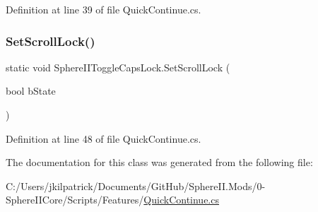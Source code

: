 Definition at line 39 of file Quick\+Continue.\+cs.

\mbox{\label{class_sphere_i_i_toggle_caps_lock_a9bcfc13eeb39d6b83d6d9215dccf620e}} 
\subsubsection{\texorpdfstring{SetScrollLock()}{SetScrollLock()}}
{\footnotesize\ttfamily static void Sphere\+I\+I\+Toggle\+Caps\+Lock.\+Set\+Scroll\+Lock (\begin{DoxyParamCaption}\item[{bool}]{b\+State }\end{DoxyParamCaption})\hspace{0.3cm}{\ttfamily [static]}}



Definition at line 48 of file Quick\+Continue.\+cs.



The documentation for this class was generated from the following file\+:\begin{DoxyCompactItemize}
\item 
C\+:/\+Users/jkilpatrick/\+Documents/\+Git\+Hub/\+Sphere\+I\+I.\+Mods/0-\/\+Sphere\+I\+I\+Core/\+Scripts/\+Features/\mbox{\hyperlink{0-_sphere_i_i_core_2_scripts_2_features_2_quick_continue_8cs}{Quick\+Continue.\+cs}}\end{DoxyCompactItemize}
